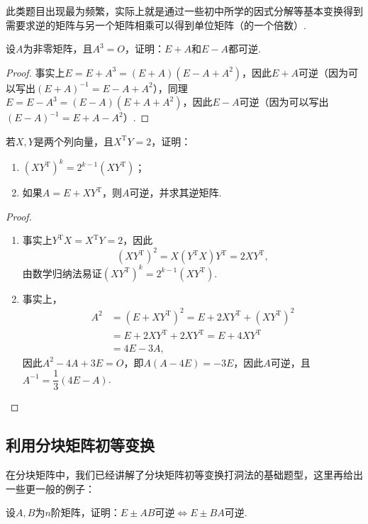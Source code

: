 此类题目出现最为频繁，实际上就是通过一些初中所学的因式分解等基本变换得到需要求逆的矩阵与另一个矩阵相乘可以得到单位矩阵（的一个倍数）.
\begin{example}
    设$A$为非零矩阵，且$A^3=O$，证明：$E+A$和$E-A$都可逆.
\end{example}

\begin{proof}
    事实上$E=E+A^3=(E+A)(E-A+A^2)$，因此$E+A$可逆（因为可以写出$(E+A)^{-1}=E-A+A^2$），同理$E=E-A^3=(E-A)(E+A+A^2)$，因此$E-A$可逆（因为可以写出$(E-A)^{-1}=E+A-A^2$）.
\end{proof}

\begin{example}
    若$X,Y$是两个列向量，且$X^\mathrm{T}Y=2$，证明：
    \begin{enumerate}
        \item $(XY^\mathrm{T})^k=2^{k-1}(XY^{\mathrm{T}})$；

        \item 如果$A=E+XY^\mathrm{T}$，则$A$可逆，并求其逆矩阵.
    \end{enumerate}
\end{example}

\begin{proof}
    \begin{enumerate}
        \item 事实上$Y^\mathrm{T}X=X^\mathrm{T}Y=2$，因此
              \[(XY^\mathrm{T})^2=X(Y^\mathrm{T}X)Y^\mathrm{T}=2XY^\mathrm{T},\]
              由数学归纳法易证$(XY^\mathrm{T})^k=2^{k-1}(XY^\mathrm{T})$.

        \item 事实上，
        \begin{align*}
            A^2&=(E+XY^\mathrm{T})^2=E+2XY^\mathrm{T}+(XY^\mathrm{T})^2 \\
            &=E+2XY^\mathrm{T}+2XY^\mathrm{T}=E+4XY^\mathrm{T} \\
            &=4E-3A,
        \end{align*}
        因此$A^2-4A+3E=O$，即$A(A-4E)=-3E$，因此$A$可逆，且$A^{-1}=\dfrac{1}{3}(4E-A)$.
    \end{enumerate}
\end{proof}

\subsection{利用分块矩阵初等变换}

在分块矩阵中，我们已经讲解了分块矩阵初等变换打洞法的基础题型，这里再给出一些更一般的例子：
\begin{example}\label{ex:12:打洞法求逆1}
    设$A,B$为$n$阶矩阵，证明：$E\pm AB$可逆$\iff E\pm BA$可逆.
\end{example}

